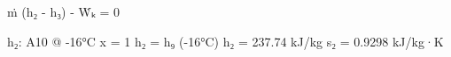 ṁ (h₂ - h₃) - Ẇₖ = 0  

h₂:  
A10 @ -16°C  
x = 1  
h₂ = h₉ (-16°C)  
h₂ = 237.74 kJ/kg  
s₂ = 0.9298 kJ/kg·K